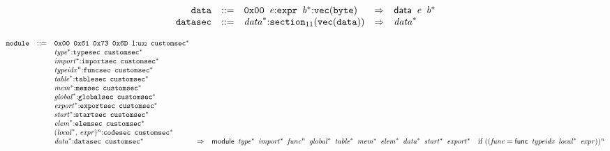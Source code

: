 \vspace{1ex}

$$
\begin{array}{@{}l@{}rrlll@{}l@{}}
& {\mathtt{data}} &::=& \mathtt{0x00}~\,{\mathit{e}}{:}{\mathtt{expr}}~\,{{\mathit{b}}^\ast}{:}{\mathtt{vec}}({\mathtt{byte}}) &\Rightarrow& \mathsf{data}~\,{\mathit{e}}~\,{{\mathit{b}}^\ast} \\
& {\mathtt{datasec}} &::=& {{\mathit{data}}^\ast}{:}{{\mathtt{section}}}_{11}({\mathtt{vec}}({\mathtt{data}})) &\Rightarrow& {{\mathit{data}}^\ast} \\
\end{array}
$$

\vspace{1ex}

$$
\begin{array}{@{}l@{}rrlll@{}l@{}}
& {\mathtt{module}} &::=& \mathtt{0x00}~\,\mathtt{0x61}~\,\mathtt{0x73}~\,\mathtt{0x6D}~\,1{:}{\mathtt{u{\scriptstyle32}}}~\,{{\mathtt{customsec}}^\ast} \\ &&&{{\mathit{type}}^\ast}{:}{\mathtt{typesec}}~\,{{\mathtt{customsec}}^\ast} \\ &&&{{\mathit{import}}^\ast}{:}{\mathtt{importsec}}~\,{{\mathtt{customsec}}^\ast} \\ &&&{{\mathit{typeidx}}^{{\mathit{n}}}}{:}{\mathtt{funcsec}}~\,{{\mathtt{customsec}}^\ast} \\ &&&{{\mathit{table}}^\ast}{:}{\mathtt{tablesec}}~\,{{\mathtt{customsec}}^\ast} \\ &&&{{\mathit{mem}}^\ast}{:}{\mathtt{memsec}}~\,{{\mathtt{customsec}}^\ast} \\ &&&{{\mathit{global}}^\ast}{:}{\mathtt{globalsec}}~\,{{\mathtt{customsec}}^\ast} \\ &&&{{\mathit{export}}^\ast}{:}{\mathtt{exportsec}}~\,{{\mathtt{customsec}}^\ast} \\ &&&{{\mathit{start}}^\ast}{:}{\mathtt{startsec}}~\,{{\mathtt{customsec}}^\ast} \\ &&&{{\mathit{elem}}^\ast}{:}{\mathtt{elemsec}}~\,{{\mathtt{customsec}}^\ast} \\ &&&{({{\mathit{local}}^\ast},\, {\mathit{expr}})^{{\mathit{n}}}}{:}{\mathtt{codesec}}~\,{{\mathtt{customsec}}^\ast} \\ &&&{{\mathit{data}}^\ast}{:}{\mathtt{datasec}}~\,{{\mathtt{customsec}}^\ast} &\Rightarrow& \mathsf{module}~\,{{\mathit{type}}^\ast}~\,{{\mathit{import}}^\ast}~\,{{\mathit{func}}^{{\mathit{n}}}}~\,{{\mathit{global}}^\ast}~\,{{\mathit{table}}^\ast}~\,{{\mathit{mem}}^\ast}~\,{{\mathit{elem}}^\ast}~\,{{\mathit{data}}^\ast}~\,{{\mathit{start}}^\ast}~\,{{\mathit{export}}^\ast} &\quad
  \mbox{if}~(({\mathit{func}} = \mathsf{func}~\,{\mathit{typeidx}}~\,{{\mathit{local}}^\ast}~\,{\mathit{expr}}))^{{\mathit{n}}} \\
\end{array}
$$

